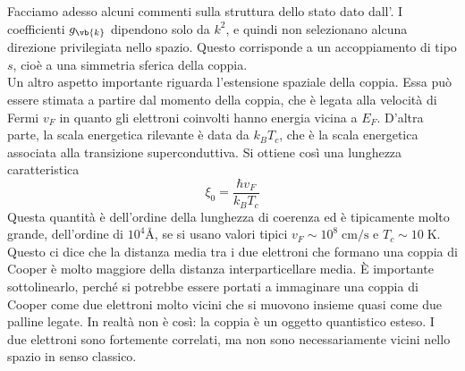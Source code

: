 Facciamo adesso alcuni commenti sulla struttura dello stato dato dall'. I coefficienti $g_{\vb{k}}$ dipendono solo da $k^2$, e quindi non selezionano alcuna direzione privilegiata nello spazio. Questo corrisponde a un accoppiamento di tipo $s$, cioè a una simmetria sferica della coppia.\\
Un altro aspetto importante riguarda l'estensione spaziale della coppia. Essa può essere stimata a partire dal momento della coppia, che è legata alla velocità di Fermi $v_F$ in quanto gli elettroni coinvolti hanno energia vicina a $E_F$. D'altra parte, la scala energetica rilevante è data da $k_B T_c$, che è la scala energetica associata alla transizione superconduttiva. Si ottiene così una lunghezza caratteristica
\begin{equation*}
   \xi_0
   =\frac{\hbar v_F}{k_B T_c}
\end{equation*}
Questa quantità è dell'ordine della lunghezza di coerenza ed è tipicamente molto grande, dell'ordine di $10^4$\;\AA, se si usano valori tipici $v_F\sim 10^8\;\mathrm{cm/s}$ e $T_c\sim 10\;\mathrm{K}$.\\
Questo ci dice che la distanza media tra i due elettroni che formano una coppia di Cooper è molto maggiore della distanza interparticellare media. È importante sottolinearlo, perché si potrebbe essere portati a immaginare una coppia di Cooper come due elettroni molto vicini che si muovono insieme quasi come due palline legate. In realtà non è così: la coppia è un oggetto quantistico esteso. I due elettroni sono fortemente correlati, ma non sono necessariamente vicini nello spazio in senso classico.
